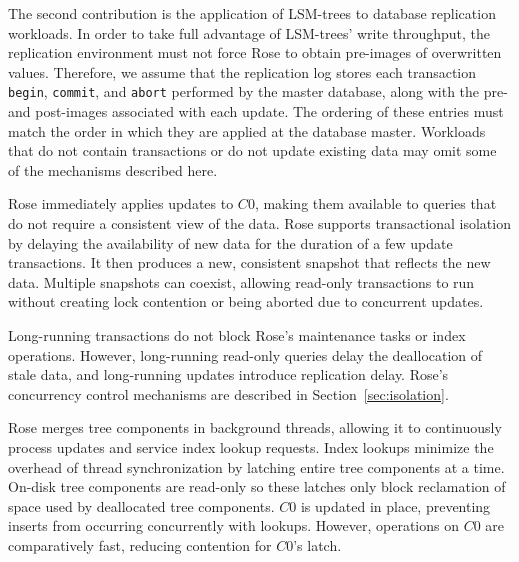 \documentclass{vldb}
\newcommand{\rows}{Rose\xspace}
\newcommand{\rowss}{Rose's\xspace}
\begin{document}
The second contribution is the application of LSM-trees to database
replication workloads.  In order to take full advantage of LSM-trees'
write throughput, the replication environment must not force \rows to
obtain pre-images of overwritten values.  Therefore, we assume that the
replication log stores each transaction {\tt begin}, {\tt commit},
and {\tt abort} performed by the master database, along with the pre-
and post-images associated with each update.  The ordering of
these entries must match the order in which they are applied at the
database master.  Workloads that do not contain transactions or do not
update existing data may omit some of the mechanisms described here.

\rows immediately applies updates to $C0$, making them
available to queries that do not require a consistent view of the
data.  \rows supports transactional isolation by delaying the
availability of new data for the duration of a few update
transactions.  It then produces a new, consistent snapshot that
reflects the new data.  Multiple snapshots can coexist, allowing 
read-only transactions to run without creating lock contention or being
aborted due to concurrent updates.

Long-running transactions do not block \rowss maintenance tasks or
index operations.  However, long-running read-only queries delay
the deallocation of stale data, and long-running updates introduce
replication delay. \rowss concurrency control
mechanisms are described in Section~\ref{sec:isolation}.


\rows merges tree components in background threads, allowing
it to continuously process updates and service index lookup requests.
Index lookups minimize the overhead of thread synchronization by
latching entire tree components at a time.  On-disk tree
components are read-only so these latches only block reclamation of
space used by deallocated tree components.  $C0$ is
updated in place, preventing inserts from occurring concurrently with
lookups.  However, operations on $C0$ are comparatively
fast, reducing contention for $C0$'s latch.
\end{document}
